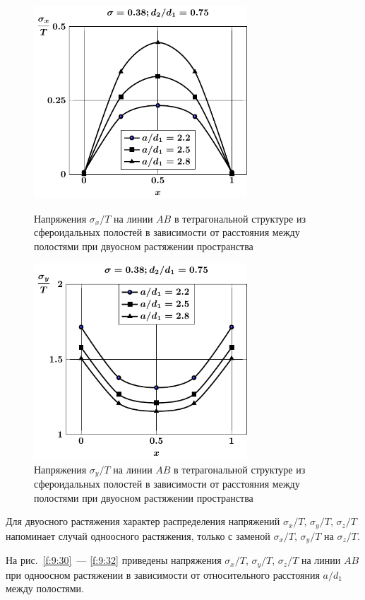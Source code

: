 \begin{figure}[h!]
\centering\footnotesize
\parbox[b]{7.5cm}{\centering\includegraphics[width=8cm]{cav8-a-d75-t2-sig_x-ab.pdf}
\caption{Напряжения $\sigma_x/T$ на линии $AB$ в тетрагональной структуре из сфероидальных полостей в зависимости от расстояния между полостями при двуосном растяжении пространства
\label{f:9:33}}}\hfil\hfil
\parbox[b]{7.5cm}{\centering\includegraphics[width=8cm]{cav8-a-d75-t2-sig_y-ab.pdf}
\caption{Напряжения $\sigma_y/T$ на линии $AB$ в тетрагональной структуре из сфероидальных полостей в зависимости от расстояния между полостями при двуосном растяжении пространства
\label{f:9:34}}}
\end{figure}

Для двуосного растяжения характер распределения напряжений $\sigma_x/T$, $\sigma_y/T$, $\sigma_z/T$ напоминает случай одноосного растяжения, только с заменой $\sigma_x/T$, $\sigma_y/T$ на $\sigma_z/T$.

На рис.~\ref{f:9:30}~--- \ref{f:9:32} приведены напряжения $\sigma_x/T$, $\sigma_y/T$, $\sigma_z/T$ на линии $AB$ при одноосном растяжении в зависимости от относительного расстояния $a/d_1$ между полостями.

